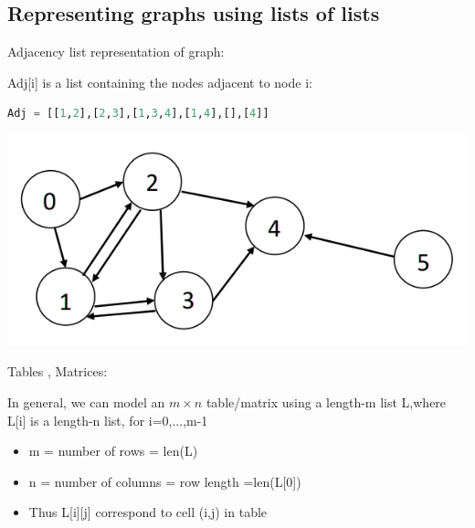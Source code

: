 \documentclass[12pt,oneside]{book}
\begin{document}
\subsection{Representing graphs using lists of lists}
Adjacency list representation of graph:

\begin{minipage}{0.6\linewidth}
	Adj[i] is a list containing the nodes adjacent to node i:
\begin{lstlisting}[language=python]
Adj = [[1,2],[2,3],[1,3,4],[1,4],[],[4]]
\end{lstlisting}
\end{minipage}
\begin{minipage}{0.4\linewidth}
	\includegraphics[width=\linewidth]{../pic/python/15.png}
\end{minipage}
Tables , Matrices:\\
\begin{minipage}{0.69\linewidth}
	In general, we can model an $m\times n$ table/matrix using a length-m list L,where L[i] is a length-n list, for i=0,...,m-1
	\begin{itemize}
		\item m = number of rows = len(L)
		\item n = number of columns = row length =len(L[0])
		\item Thus L[i][j] correspond to cell (i,j) in table
	\end{itemize}
\end{minipage}
\end{document}
